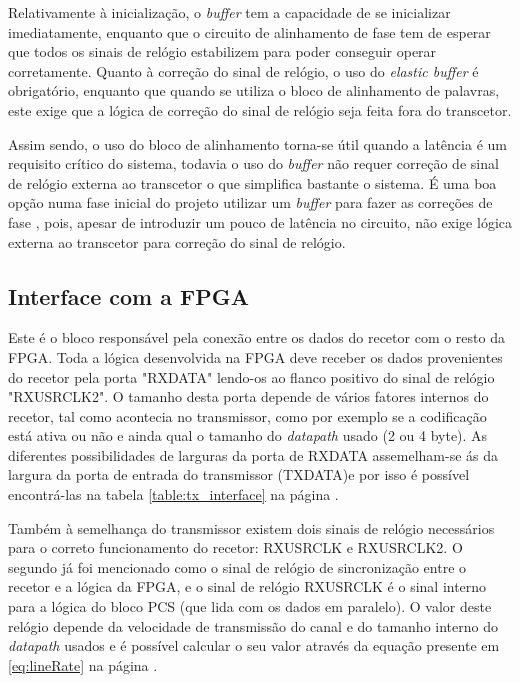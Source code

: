 Relativamente à inicialização, o \textit{buffer} tem a capacidade de se inicializar imediatamente, enquanto que o circuito de alinhamento de fase tem de esperar que todos os sinais de relógio estabilizem para poder conseguir operar corretamente. Quanto à correção do sinal de relógio, o uso do\textit{ elastic buffer} é obrigatório, enquanto que quando se utiliza o bloco de alinhamento de palavras, este exige que a lógica de correção do sinal de relógio seja feita fora do transcetor.

Assim sendo, o uso do bloco de alinhamento torna-se útil quando a latência é um requisito crítico do sistema, todavia o uso do \textit{buffer} não requer correção de sinal de relógio externa ao transcetor o que simplifica bastante o sistema. É uma boa opção numa fase inicial do projeto utilizar um \textit{buffer} para fazer as correções de fase , pois, apesar de introduzir um pouco de latência no circuito, não exige lógica externa ao transcetor para correção do sinal de relógio.

\subsection{Interface com a FPGA}

Este é o bloco responsável pela conexão entre os dados do recetor com o resto da FPGA. Toda a lógica desenvolvida na FPGA deve receber os dados provenientes do recetor pela porta "RXDATA" lendo-os ao flanco positivo do sinal de relógio "RXUSRCLK2". O tamanho desta porta depende de vários fatores internos do recetor, tal como acontecia no transmissor,  como por exemplo se a codificação está ativa ou não e ainda qual o tamanho do \textit{datapath} usado (2 ou 4 byte). As diferentes possibilidades de larguras da porta de RXDATA assemelham-se ás da largura da porta de entrada do transmissor (TXDATA)e por isso é possível encontrá-las na tabela \ref{table:tx_interface} na página \pageref{table:tx_interface}.

Também à semelhança do transmissor existem dois sinais de relógio necessários para o correto funcionamento do recetor: RXUSRCLK e RXUSRCLK2. O segundo já foi mencionado como o sinal de relógio de sincronização entre o recetor e a lógica da FPGA, e o sinal de relógio RXUSRCLK é o sinal interno para a lógica do bloco PCS (que lida com os dados em paralelo). O valor deste relógio depende da velocidade de transmissão do canal e do tamanho interno do \textit{datapath} usados e é possível calcular o seu valor através da equação presente em \ref{eq:lineRate} na página \pageref{eq:lineRate}.

